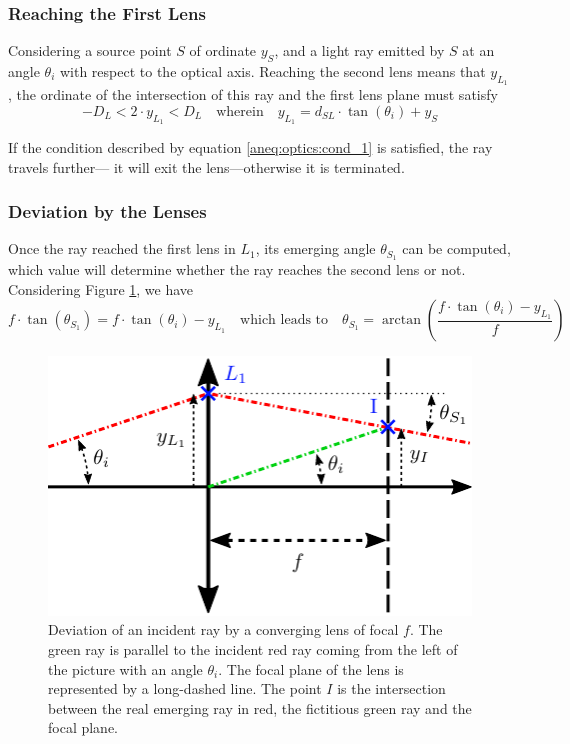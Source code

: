\subsubsection{Reaching the First Lens}

Considering a source point $S$ of ordinate $y_S$, and a light ray emitted by $S$ at an angle $\theta_i$ with respect to the optical axis. Reaching the second lens means that $y_{L_1}$, the ordinate of the intersection of this ray and the first lens plane must satisfy
\begin{equation}\label{aneq:optics:cond_1}
	-D_L < 2\cdot y_{L_1} < D_L \quad \text{wherein} \quad	y_{L_1} =  d_{SL} \cdot \tan(\theta_i) + y_S
\end{equation}

If the condition described by equation \ref{aneq:optics:cond_1} is satisfied, the ray travels further---\ie{} it will exit the lens---otherwise it is terminated.

\subsubsection{Deviation by the Lenses}

Once the ray reached the first lens in $L_1$, its emerging angle $\theta_{S_1}$ can be computed, which value will determine whether the ray reaches the second lens or not. Considering Figure \ref{anfig:optics:collecting_lens_int}, we have
\begin{equation}\label{aneq:optics:dev1}
	f\cdot \tan(\theta_{S_1}) = f\cdot \tan(\theta_i) - y_{L_1}\quad \text{which leads to} \quad \theta_{S_1} = \arctan \left( \frac{f\cdot \tan(\theta_i) - y_{L_1}}{f} \right)
\end{equation}

\begin{figure}
	\centering
	\includegraphics{2_appendices/optical_figures/collecting_lens_int_converted.pdf}
	\caption[Deviation of an incident ray by a converging lens of focal $f$.]{Deviation of an incident ray by a converging lens of focal $f$. The green ray is parallel to the incident red ray coming from the left of the picture with an angle $\theta_i$. The focal plane of the lens is represented by a long-dashed line. The point $I$ is the intersection between the real emerging ray in red, the fictitious green ray and the focal plane.}
	\label{anfig:optics:collecting_lens_int}
\end{figure}

